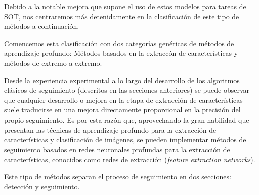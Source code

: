 Debido a la notable mejora que supone el uso de estos modelos para tareas de SOT, nos centraremos más detenidamente en la clasificación de este tipo de métodos a continuación.

Comencemos esta clasificación con dos categorías genéricas de métodos de aprendizaje profundo: Métodos basados en la extraccón de características y métodos de extremo a extremo.

\vspace{0.6cm}
\bigskip
{}

\vspace{0.4cm}

Desde la experiencia experimental a lo largo del desarrollo de los algoritmos clásicos de seguimiento (descritos en las secciones anteriores) se puede observar que cualquier desarrollo o mejora en la etapa de extracción de características suele traducirse en una mejora directamente proporcional en la precisión del propio seguimiento. Es por esta razón que, aprovechando la gran habilidad que presentan las técnicas de aprendizaje profundo para la extracción de características y clasificación de imágenes, se pueden implementar métodos de seguimiento basados en redes neuronales profundas para la extracción de características, conocidos como redes de extracción (\textit{feature extraction networks}).

Este tipo de métodos separan el proceso de seguimiento en dos secciones: detección y seguimiento.

